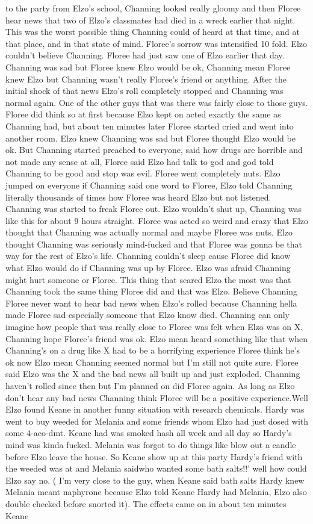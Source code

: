 \documentclass[12pt]{book}
\begin{document}
to the party from Elzo's school, Channing looked really gloomy and then Floree hear news that two of Elzo's classmates had died in a wreck earlier that night. This was the worst possible thing Channing could of heard at that time, and at that place, and in that state of mind. Floree's sorrow was intensified 10 fold. Elzo couldn't believe Channing. Floree had just saw one of Elzo earlier that day. Channing was sad but Floree knew Elzo would be ok, Channing mean Floree knew Elzo but Channing wasn't really Floree's friend or anything. After the initial shock of that news Elzo's roll completely stopped and Channing was normal again. One of the other guys that was there was fairly close to those guys. Floree did think so at first because Elzo kept on acted exactly the same as Channing had, but about ten minutes later Floree started cried and went into another room. Elzo knew Channing was sad but Floree thought Elzo would be ok. But Channing started preached to everyone, said how drugs are horrible and not made any sense at all, Floree said Elzo had talk to god and god told Channing to be good and stop was evil. Floree went completely nuts. Elzo jumped on everyone if Channing said one word to Floree, Elzo told Channing literally thousands of times how Floree was heard Elzo but not listened. Channing was started to freak Floree out. Elzo wouldn't shut up, Channing was like this for about 9 hours straight. Floree was acted so weird and crazy that Elzo thought that Channing was actually normal and maybe Floree was nuts. Elzo thought Channing was seriously mind-fucked and that Floree was gonna be that way for the rest of Elzo's life. Channing couldn't sleep cause Floree did know what Elzo would do if Channing was up by Floree. Elzo was afraid Channing might hurt someone or Floree. This thing that scared Elzo the most was that Channing took the same thing Floree did and that was Elzo. Believe Channing Floree never want to hear bad news when Elzo's rolled because Channing hella made Floree sad especially someone that Elzo know died. Channing can only imagine how people that was really close to Floree was felt when Elzo was on X. Channing hope Floree's friend was ok. Elzo mean heard something like that when Channing's on a drug like X had to be a horrifying experience Floree think he's ok now Elzo mean Channing seemed normal but I'm still not quite sure. Floree said Elzo was the X and the bad news all built up and just exploded. Channing haven't rolled since then but I'm planned on did Floree again. As long as Elzo don't hear any bad news Channing think Floree will be a positive experience.Well Elzo found Keane in another funny situation with research chemicals. Hardy was went to buy weeded for Melania and some friends whom Elzo had just dosed with some 4-aco-dmt. Keane had was smoked hash all week and all day so Hardy's mind was kinda fucked. Melania was forgot to do things like blow out a candle before Elzo leave the house. So Keane show up at this party Hardy's friend with the weeded was at and Melania saidwho wanted some bath salts!!' well how could Elzo say no. ( I'm very close to the guy, when Keane said bath salts Hardy knew Melania meant naphyrone because Elzo told Keane Hardy had Melania, Elzo also double checked before snorted it). The effects came on in about ten minutes Keane 
\end{document}
